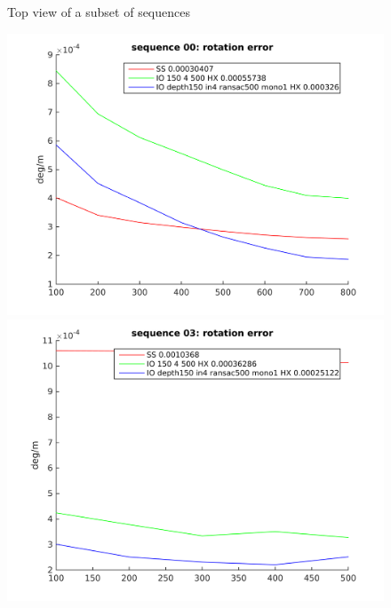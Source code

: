 \documentclass[runningheads]{llncs}
\begin{document}
\begin{figure}
\begin{minipage}[t]{.3\linewidth}
  \end{minipage}
  \caption{Top view of a subset of sequences}
\end{figure}

\begin{figure}
  \begin{minipage}[t]{.3\linewidth}
    \centering
    \includegraphics[width=\textwidth]{rotation_error_00}
    \includegraphics[width=\textwidth]{rotation_error_03}
  \end{minipage}
  \begin{minipage}[t]{.3\linewidth}
    \centering

\end{minipage}
\end{figure}
\end{document}
